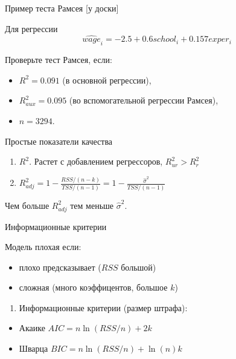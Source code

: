 \documentclass[russian,ignorenonframetext,]{beamer}
\providecommand{\tightlist}{%
  \setlength{\itemsep}{0pt}\setlength{\parskip}{0pt}}
\begin{document}
\begin{frame}{Пример теста Рамсея {[}у доски{]}}

Для регрессии \[
\widehat{wage}_i=-2.5+0.6 school_i + 0.157 exper_i
\]

Проверьте тест Рамсея, если:

\begin{itemize}
\item
  \(R^2=0.091\) (в основной регрессии),
\item
  \(R^2_{aux}=0.095\) (во вспомогательной регрессии Рамсея),
\item
  \(n=3294\).
\end{itemize}

\end{frame}

\begin{frame}{Простые показатели качества}

\begin{enumerate}
\def\labelenumi{\arabic{enumi}.}
\item
  \(R^2\). Растет с добавлением регрессоров, \(R^2_{ur}>R^2_r\)
\item
  \(R^2_{adj}=1-\frac{RSS/(n-k)}{TSS/(n-1)}=1-\frac{\hat{\sigma}^2}{TSS/(n-1)}\)
\end{enumerate}

Чем больше \(R^2_{adj}\) тем меньше \(\hat{\sigma}^2\).

\end{frame}

\begin{frame}{Информационные критерии}

Модель плохая если:

\begin{itemize}
\item
  плохо предсказывает (\(RSS\) большой)
\item
  сложная (много коэффицентов, большое \(k\))
\end{itemize}

\begin{enumerate}
\def\labelenumi{\arabic{enumi}.}
\setcounter{enumi}{2}
\tightlist
\item
  Информационные критерии (размер штрафа):
\end{enumerate}

\begin{itemize}
\item
  Акаике \(AIC=n \ln (RSS/n) + 2k\)
\item
  Шварца \(BIC=n \ln (RSS/n) + \ln(n) k\)
\end{itemize}

\end{frame}
\end{document}
